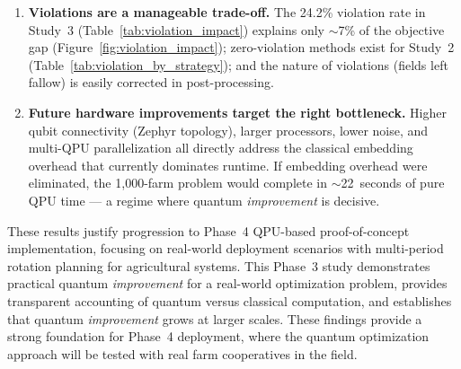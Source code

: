 \begin{enumerate}
    \item \textbf{Violations are a manageable trade-off.} The 24.2\% violation rate in Study~3 (Table~\ref{tab:violation_impact}) explains only $\sim$7\% of the objective gap (Figure~\ref{fig:violation_impact}); zero-violation methods exist for Study~2 (Table~\ref{tab:violation_by_strategy}); and the nature of violations (fields left fallow) is easily corrected in post-processing.

    \item \textbf{Future hardware improvements target the right bottleneck.} Higher qubit connectivity (Zephyr topology), larger processors, lower noise, and multi-QPU parallelization all directly address the classical embedding overhead that currently dominates runtime. If embedding overhead were eliminated, the 1,000-farm problem would complete in $\sim$22~seconds of pure QPU time --- a regime where quantum \textit{improvement} is decisive.
\end{enumerate}

These results justify progression to Phase~4 QPU-based proof-of-concept implementation, focusing on real-world deployment scenarios with multi-period rotation planning for agricultural systems. This Phase~3 study demonstrates practical quantum \textit{improvement} for a real-world optimization problem, provides transparent accounting of quantum versus classical computation, and establishes that quantum \textit{improvement} grows at larger scales. These findings provide a strong foundation for Phase~4 deployment, where the quantum optimization approach will be tested with real farm cooperatives in the field.



